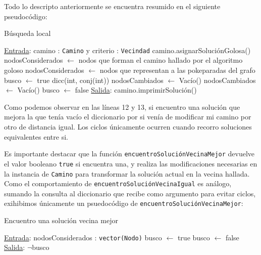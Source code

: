 Todo lo descripto anteriormente se encuentra resumido en el siguiente pseudoc\'odigo:

\begin{algorithm}[H]
\label{}
\caption{B\'usqueda local}
\begin{algorithmic}[1]
\Statex \underline{Entrada}: camino : \texttt{Camino} y criterio : \texttt{Vecindad}
\medskip
\State camino.asignarSoluci\'onGolosa()
        \State nodosConsiderados $\gets$ nodos que forman el camino hallado por el algoritmo goloso
    \Else
        \State nodosConsiderados $\gets$ nodos que representan a las pokeparadas del grafo
    \EndIf
    \State busco $\gets$ true
    \State dicc(int, conj(int)) nodosCambiados $\gets$ Vac\'io()
                \State nodosCambiados $\gets$ Vac\'io()
            \EndIf
        \EndWhile
            \State busco $\gets$ false
        \EndIf
    \EndWhile
\EndIf
\medskip
\Statex \underline{Salida}: camino.imprimirSoluci\'on()
\end{algorithmic}
\end{algorithm}

Como podemos observar en las l\'ineas 12 y 13, si encuentro una soluci\'on que mejora la que ten\'ia vac\'io el diccionario por si ven\'ia de modificar mi camino por otro de distancia igual. Los ciclos \'unicamente ocurren cuando recorro soluciones equivalentes entre si.

Es importante destacar que la funci\'on \texttt{encuentroSoluci\'onVecinaMejor} devuelve el valor booleano \texttt{true} si encuentra una, y realiza las modificaciones necesarias en la instancia de \texttt{Camino} para transformar la soluci\'on actual en la vecina hallada. Como el comportamiento de \texttt{encuentroSoluci\'onVecinaIgual} es an\'alogo, sumando la consulta al diccionario que recibe como argumento para evitar ciclos, exihibimos \'unicamente un psuedoc\'odigo de \texttt{encuentroSoluci\'onVecinaMejor}:

\begin{algorithm}[H]
\label{}
\caption{Encuentro una soluci\'on vecina mejor}
\begin{algorithmic}[1]
\Statex \underline{Entrada}: nodosConsiderados : \texttt{vector(Nodo)}
\medskip
\State busco $\gets$ true
            \State busco $\gets$ false
        \EndIf
    \EndFor
\EndFor
\medskip
\Statex \underline{Salida}: $\neg$busco
\end{algorithmic}
\end{algorithm}

